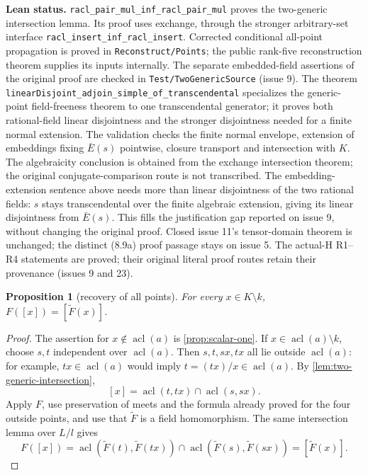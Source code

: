 \documentclass[11pt,oneside]{article}
\newtheorem{proposition}[theorem]{Proposition}
\theoremstyle{definition}
\theoremstyle{remark}
\newcommand{\acl}{\operatorname{acl}}
\newcommand{\lean}[1]{\nolinkurl{#1}}
\begin{document}
\noindent\textbf{Lean status.}
\lean{racl_pair_mul_inf_racl_pair_mul} proves the two-generic intersection lemma.
Its proof uses exchange, through the stronger arbitrary-set interface
\lean{racl_insert_inf_racl_insert}. Corrected conditional all-point propagation is proved
in \lean{Reconstruct/Points}; the public rank-five reconstruction theorem supplies its inputs
internally. The separate embedded-field assertions of the original proof are checked in
\lean{Test/TwoGenericSource} (issue 9). The theorem
\lean{linearDisjoint_adjoin_simple_of_transcendental} specializes the generic-point field-freeness
theorem to one transcendental generator; it proves both rational-field linear disjointness and
the stronger disjointness needed for a finite normal extension. The validation checks the
finite normal envelope, extension of embeddings fixing $\bar E(s)$ pointwise, closure transport
and intersection with $K$. The algebraicity conclusion is obtained from the exchange
intersection theorem; the original conjugate-comparison route is not transcribed.
The embedding-extension sentence above needs more than linear disjointness of the two
rational fields: $s$ stays transcendental over the finite algebraic extension, giving its
linear disjointness from $\bar E(s)$. This fills the justification gap reported on issue 9,
without changing the original proof. Closed issue 11's tensor-domain theorem is unchanged;
the distinct (8.9a) proof passage stays on issue 5. The actual-H R1--R4 statements are proved;
their original literal proof routes retain
their provenance (issues 9 and 23).

\begin{proposition}[recovery of all points]\label{prop:all-points}
For every $x\in K\setminus k$, $F([x])=[\widetilde F(x)]$.
\end{proposition}
\begin{proof}
The assertion for $x\notin\acl(a)$ is \cref{prop:scalar-one}.  If
$x\in\acl(a)\setminus k$, choose $s,t$ independent over $\acl(a)$.  Then
$s,t,sx,tx$ all lie outside $\acl(a)$: for example, $tx\in\acl(a)$ would imply
$t=(tx)/x\in\acl(a)$.  By \cref{lem:two-generic-intersection},
\[
 [x]=\acl(t,tx)\cap\acl(s,sx).
\]
Apply $F$, use preservation of meets and the formula already proved for the four outside
points, and use that $\widetilde F$ is a field homomorphism.  The same intersection lemma
over $L/l$ gives
\[
 F([x])=\acl(\widetilde F(t),\widetilde F(tx))
        \cap\acl(\widetilde F(s),\widetilde F(sx))
       =[\widetilde F(x)].
\]
\end{proof}
\end{document}
